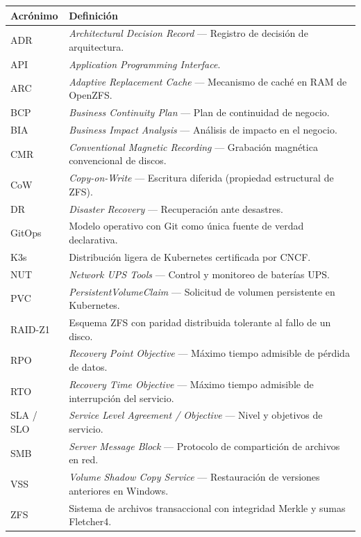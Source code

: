 \documentclass[10pt,a4paper]{article}
\begin{document}
\begin{table}[htbp]
\centering
\small
\begin{tabular}{|l|p{12.5cm}|}
\hline
\textbf{\textsf{Acrónimo}} & \textbf{\textsf{Definición}} \\
\hline
ADR & \textit{Architectural Decision Record} — Registro de decisión de arquitectura. \\
\hline
API & \textit{Application Programming Interface}. \\
\hline
ARC & \textit{Adaptive Replacement Cache} — Mecanismo de caché en RAM de OpenZFS. \\
\hline
BCP & \textit{Business Continuity Plan} — Plan de continuidad de negocio. \\
\hline
BIA & \textit{Business Impact Analysis} — Análisis de impacto en el negocio. \\
\hline
CMR & \textit{Conventional Magnetic Recording} — Grabación magnética convencional de discos. \\
\hline
CoW & \textit{Copy-on-Write} — Escritura diferida (propiedad estructural de ZFS). \\
\hline
DR & \textit{Disaster Recovery} — Recuperación ante desastres. \\
\hline
GitOps & Modelo operativo con Git como única fuente de verdad declarativa. \\
\hline
K3s & Distribución ligera de Kubernetes certificada por CNCF. \\
\hline
NUT & \textit{Network UPS Tools} — Control y monitoreo de baterías UPS. \\
\hline
PVC & \textit{PersistentVolumeClaim} — Solicitud de volumen persistente en Kubernetes. \\
\hline
RAID-Z1 & Esquema ZFS con paridad distribuida tolerante al fallo de un disco. \\
\hline
RPO & \textit{Recovery Point Objective} — Máximo tiempo admisible de pérdida de datos. \\
\hline
RTO & \textit{Recovery Time Objective} — Máximo tiempo admisible de interrupción del servicio. \\
\hline
SLA / SLO & \textit{Service Level Agreement / Objective} — Nivel y objetivos de servicio. \\
\hline
SMB & \textit{Server Message Block} — Protocolo de compartición de archivos en red. \\
\hline
VSS & \textit{Volume Shadow Copy Service} — Restauración de versiones anteriores en Windows. \\
\hline
ZFS & Sistema de archivos transaccional con integridad Merkle y sumas Fletcher4. \\
\hline
\end{tabular}
\end{table}
\end{document}

